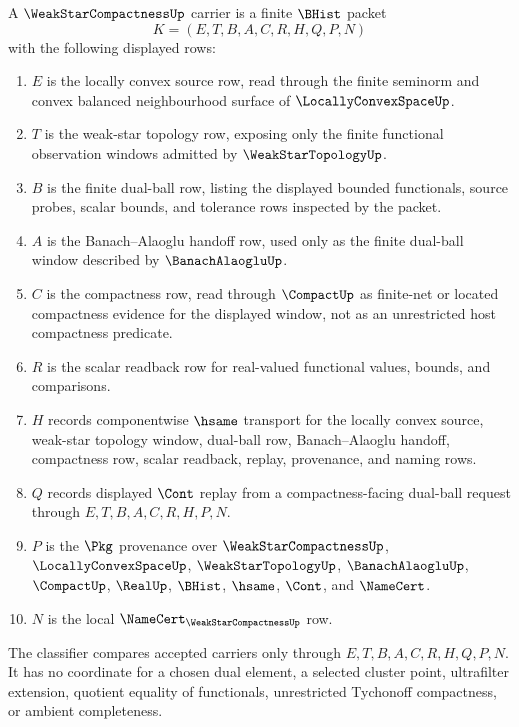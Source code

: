 \begin{definition}
\label{def:weak-star-compactness-carrier}
A $\WeakStarCompactnessUp$ carrier is a finite $\BHist$ packet
$$
K=(E,T,B,A,C,R,H,Q,P,N)
$$
with the following displayed rows:
\begin{enumerate}
\item $E$ is the locally convex source row, read through the finite seminorm and convex balanced neighbourhood surface of $\LocallyConvexSpaceUp$.
\item $T$ is the weak-star topology row, exposing only the finite functional observation windows admitted by $\WeakStarTopologyUp$.
\item $B$ is the finite dual-ball row, listing the displayed bounded functionals, source probes, scalar bounds, and tolerance rows inspected by the packet.
\item $A$ is the Banach--Alaoglu handoff row, used only as the finite dual-ball window described by $\BanachAlaogluUp$.
\item $C$ is the compactness row, read through $\CompactUp$ as finite-net or located compactness evidence for the displayed window, not as an unrestricted host compactness predicate.
\item $R$ is the scalar readback row for real-valued functional values, bounds, and comparisons.
\item $H$ records componentwise $\hsame$ transport for the locally convex source, weak-star topology window, dual-ball row, Banach--Alaoglu handoff, compactness row, scalar readback, replay, provenance, and naming rows.
\item $Q$ records displayed $\Cont$ replay from a compactness-facing dual-ball request through $E,T,B,A,C,R,H,P,N$.
\item $P$ is the $\Pkg$ provenance over $\WeakStarCompactnessUp$, $\LocallyConvexSpaceUp$, $\WeakStarTopologyUp$, $\BanachAlaogluUp$, $\CompactUp$, $\RealUp$, $\BHist$, $\hsame$, $\Cont$, and $\NameCert$.
\item $N$ is the local $\NameCert_{\WeakStarCompactnessUp}$ row.
\end{enumerate}
The classifier compares accepted carriers only through $E,T,B,A,C,R,H,Q,P,N$. It has no coordinate for a chosen dual element, a selected cluster point, ultrafilter extension, quotient equality of functionals, unrestricted Tychonoff compactness, or ambient completeness.
\end{definition}

